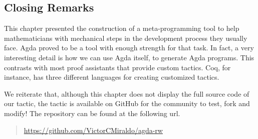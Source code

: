 \subsection{Closing Remarks}

This chapter presented the construction of a meta-programming tool to help mathematicians
with mechanical steps in the development process they usually face. Agda proved
to be a tool with enough strength for that task. In fact, a very interesting detail is
how we can use Agda itself, to generate Agda programs. This contrasts with most proof assistants
that provide custom tactics. Coq, for instance, has three different languages for creating
customized tactics.

We reiterate that, although this chapter does not display the full source code of our tactic,
the tactic is available on GitHub for the community to test, fork and modify! The repository
can be found at the following url.
\begin{quote}
\small \url{https://github.com/VictorCMiraldo/agda-rw}
\end{quote}

